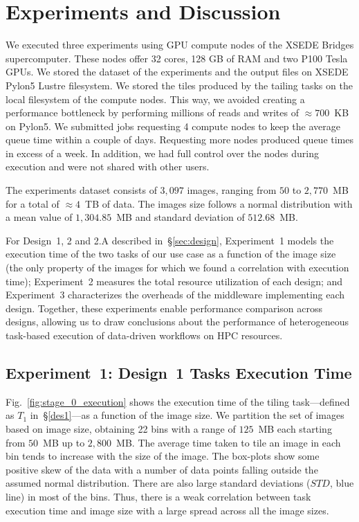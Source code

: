 \section{Experiments and Discussion}\label{sec:des_experiments}
We executed three experiments using GPU compute nodes of the XSEDE Bridges supercomputer.
These nodes offer 32 cores, 128 GB of RAM and two P100 Tesla GPUs.
We stored the dataset of the experiments and the output files on XSEDE Pylon5 Lustre filesystem.
We stored the tiles produced by the tailing tasks on the local filesystem of the compute nodes.
This way, we avoided creating a performance bottleneck by performing millions of reads and writes of $\approx700$~KB on Pylon5.
We submitted jobs requesting 4 compute nodes to keep the average queue time within a couple of days.
Requesting more nodes produced queue times in excess of a week.
In addition, we had full control over the nodes during execution and were not shared with other users.

The experiments dataset consists of $3,097$ images, ranging from $50$ to $2,770$~MB for a total of $\approx4$~TB of data.
The images size follows a normal distribution with a mean value of $1,304.85$~MB and standard deviation of $512.68$~MB.


For Design~1, 2 and 2.A described in~\S\ref{sec:design}, Experiment~1 models the execution time of the two tasks of our use case as a function of the image size (the only property of the images for which we found a correlation with execution time); Experiment~2 measures the total resource utilization of each design; and Experiment~3 characterizes the overheads of the middleware implementing each design.
Together, these experiments enable performance comparison across designs, allowing us to draw conclusions about the performance of heterogeneous task-based execution of data-driven workflows on HPC resources.

\subsection{Experiment~1: Design~1 Tasks Execution Time}
\label{ssec:des1analysis}


Fig.~\ref{fig:stage_0_execution} shows the execution time of the tiling task---defined as $T_{1}$ in~\S\ref{des1}---as a function of the image size.
We partition the set of images based on image size, obtaining 22 bins with a range of $125$~MB each starting from $50$~MB up to $2,800$~MB.
The average time taken to tile an image in each bin tends to increase with the size of the image.
The box-plots show some positive skew of the data with a number of data points  falling outside the assumed normal distribution.
There are also large standard  deviations ($STD$, blue line) in most of the bins.
Thus, there is a weak correlation between task execution time and image size with a large spread  across all the image sizes.

